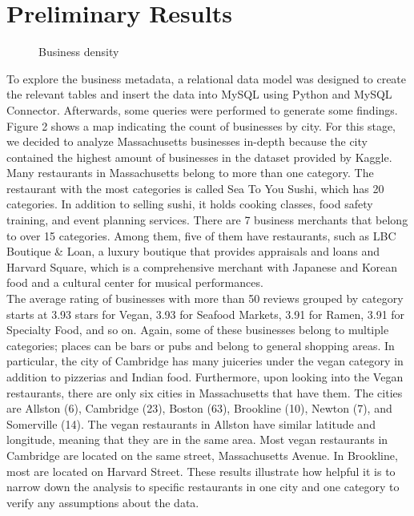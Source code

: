 \documentclass[11pt,journal,compsoc]{IEEEtran}
\begin{document}
\section{Preliminary Results}
\begin{figure*}[h]
\centering
{}
\caption{Business density}
\label{fig_sim}
\end{figure*}

To explore the business metadata, a relational data model was designed to create the relevant tables and insert the data into MySQL using Python and MySQL Connector. Afterwards, some queries were performed to generate some findings. Figure 2 shows a map indicating the count of businesses by city. For this stage, we decided to analyze Massachusetts businesses in-depth because the city contained the highest amount of businesses in the dataset provided by Kaggle. \\
\indent Many restaurants in Massachusetts belong to more than one category. The restaurant with the most categories is called Sea To You Sushi, which has 20 categories. In addition to selling sushi, it holds cooking classes, food safety training, and event planning services. There are 7 business merchants that belong to over 15 categories. Among them, five of them have restaurants, such as LBC Boutique \& Loan, a luxury boutique that provides appraisals and loans and Harvard Square, which is a comprehensive merchant with Japanese and Korean food and a cultural center for musical performances. \\
\indent The average rating of businesses with more than 50 reviews grouped by category starts at 3.93 stars for Vegan, 3.93 for Seafood Markets, 3.91 for Ramen, 3.91 for Specialty Food, and so on. Again, some of these businesses belong to multiple categories; places can be bars or pubs and belong to general shopping areas. In particular, the city of Cambridge has many juiceries under the vegan category in addition to pizzerias and Indian food. Furthermore, upon looking into the Vegan restaurants, there are only six cities in Massachusetts that have them. The cities are Allston (6), Cambridge (23), Boston (63), Brookline (10), Newton (7), and Somerville (14). The vegan restaurants in Allston have similar latitude and longitude, meaning that they are in the same area. Most vegan restaurants in Cambridge are located on the same street, Massachusetts Avenue. In Brookline, most are located on Harvard Street. These results illustrate how helpful it is to narrow down the analysis to specific restaurants in one city and one category to verify any assumptions about the data.  \\
\end{document}

